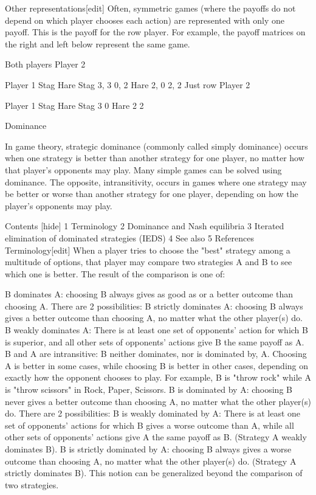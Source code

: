 \documentclass[]{report}
\begin{document}
Other representations[edit]
Often, symmetric games (where the payoffs do not depend on which player chooses each action) are represented with only one payoff. This is the payoff for the row player. For example, the payoff matrices on the right and left below represent the same game.

Both players
Player 2

Player 1
Stag	Hare
Stag	3, 3	0, 2
Hare	2, 0	2, 2
Just row
Player 2

Player 1
Stag	Hare
Stag	3	0
Hare	2	2

Dominance

In game theory, strategic dominance (commonly called simply dominance) occurs when one strategy is better than another strategy for one player, no matter how that player's opponents may play. Many simple games can be solved using dominance. The opposite, intransitivity, occurs in games where one strategy may be better or worse than another strategy for one player, depending on how the player's opponents may play.

Contents  [hide] 
1	Terminology
2	Dominance and Nash equilibria
3	Iterated elimination of dominated strategies (IEDS)
4	See also
5	References
Terminology[edit]
When a player tries to choose the "best" strategy among a multitude of options, that player may compare two strategies A and B to see which one is better. The result of the comparison is one of:

B dominates A: choosing B always gives as good as or a better outcome than choosing A. There are 2 possibilities:
B strictly dominates A: choosing B always gives a better outcome than choosing A, no matter what the other player(s) do.
B weakly dominates A: There is at least one set of opponents' action for which B is superior, and all other sets of opponents' actions give B the same payoff as A.
B and A are intransitive: B neither dominates, nor is dominated by, A. Choosing A is better in some cases, while choosing B is better in other cases, depending on exactly how the opponent chooses to play. For example, B is "throw rock" while A is "throw scissors" in Rock, Paper, Scissors.
B is dominated by A: choosing B never gives a better outcome than choosing A, no matter what the other player(s) do. There are 2 possibilities:
B is weakly dominated by A: There is at least one set of opponents' actions for which B gives a worse outcome than A, while all other sets of opponents' actions give A the same payoff as B. (Strategy A weakly dominates B).
B is strictly dominated by A: choosing B always gives a worse outcome than choosing A, no matter what the other player(s) do. (Strategy A strictly dominates B).
This notion can be generalized beyond the comparison of two strategies.
\end{document}
